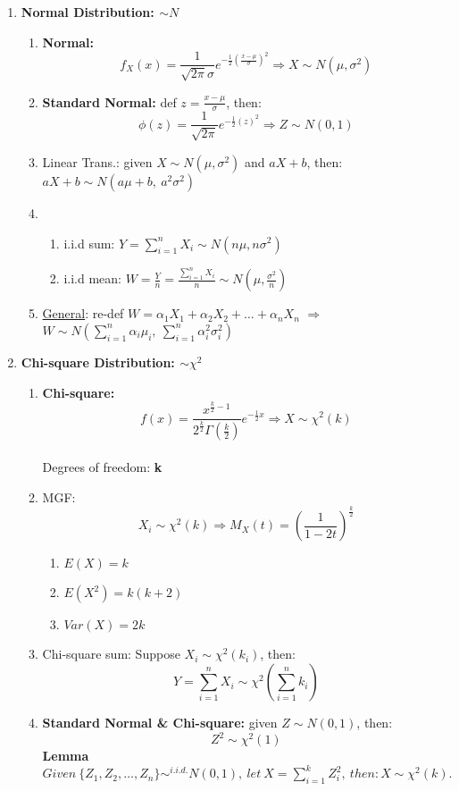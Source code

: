 \documentclass[a4paper,12pt]{article} %
\begin{document}
\begin{enumerate}

\item {{\bf Normal Distribution: $\sim N$}
\begin{enumerate}
    \item {{\bf Normal:} $$f_X(x)=\frac{1}{\sqrt{2\pi}\sigma}e^{-\frac{1}{2}(\frac{x-\mu}{\sigma})^2} \Rightarrow X \sim N(\mu,\sigma^2)$$
    }
    \item {{\bf Standard Normal:} def $z=\frac{x-\mu}{\sigma}$, then: $$\phi(z)=\frac{1}{\sqrt{2\pi}}e^{-\frac{1}{2}(z)^2} \Rightarrow  Z \sim N(0,1)$$
    }
    \item { Linear Trans.: given $X \sim N(\mu, \sigma^2)$ and $aX+b$, then: $aX+b \sim N(a\mu+b,\  a^2\sigma^2)$
    }
    \item {
    \begin{enumerate}
        \item {i.i.d sum: $Y=\sum\limits_{i=1}^n X_i \sim N(n\mu,n\sigma^2)$}
        \item {i.i.d mean: $W=\frac{Y}{n}=\frac{\sum\limits_{i=1}^n X_i}{n} \sim N(\mu,\frac{\sigma^2}{n})$}
    \end{enumerate}
    }
    \item{ \underline{General}:
    re-def $W=\alpha_1X_1+\alpha_2X_2+\dots+\alpha_nX_n$ $\Rightarrow$ $W \sim N(\sum\limits_{i=1}^n\alpha_i\mu_i,\ \sum\limits_{i=1}^n\alpha_i^2\sigma_i^2)$\\
    }
    
\end{enumerate}
}

\item {{\bf Chi-square Distribution: $\sim \chi^2$}
\begin{enumerate}
    \item { {\bf Chi-square:} $$f(x)=\frac{x^{\frac{k}{2}-1}}{2^\frac{k}{2}\Gamma(\frac{k}{2})}e^{-\frac{1}{2}x} \Rightarrow X \sim \chi^2(k)$$ \\Degrees of freedom: {\bf k}
    }
    \item {MGF: $$X_i \sim \chi^2(k) \Rightarrow M_X(t)=(\frac{1}{1-2t})^\frac{k}{2}$$
        \begin{enumerate}
            \item $E(X)=k$
            \item $E(X^2)=k(k+2)$
            \item $Var(X)=2k$  
        \end{enumerate}
    }
    \item {Chi-square sum: Suppose $X_i \sim \chi^2(k_i)$, then: $$Y=\sum\limits_{i=1}^nX_i \sim \chi^2(\sum\limits_{i=1}^nk_i)$$
    }
    \item { {\bf Standard Normal \& Chi-square:} given $Z \sim N(0,1)$, then:
    $$Z^2 \sim \chi^2(1)$$ 
    {\bf Lemma} \\$Given\ \{Z_1,Z_2,\dots,Z_n \} \sim^{i.i.d.} N(0,1),\ let\  X=\sum\limits_{i=1}^kZ_i^2,\ then: X \sim \chi^2(k).$\\
    }
\end{enumerate}
}


\end{enumerate}
\end{document}
